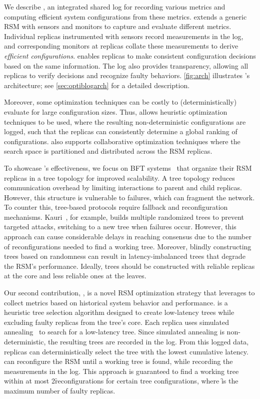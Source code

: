 We describe \sysname, an integrated shared log for recording various metrics and computing efficient system configurations from these metrics.
\sysname extends a generic \ac{RSM} with sensors and monitors to capture and evaluate different metrics.
Individual replicas instrumented with sensors record measurements in the log, and corresponding monitors at replicas collate these measurements to derive \textit{efficient configurations}.
\sysname enables replicas to make consistent configuration decisions based on the same information.
The log also provides transparency, allowing all replicas to verify decisions and recognize faulty behaviors.
\cref{fig:arch} illustrates \sysname's architecture; see \cref{sec:optiblogarch} for a detailed description.

Moreover, some optimization techniques can be costly to (deterministically) evaluate for large configuration sizes.
Thus, \sysname allows heuristic optimization techniques to be used, where the resulting non-deterministic configurations are logged, such that the replicas can consistently determine a global ranking of configurations.
\sysname also supports collaborative optimization techniques where the search space is partitioned and distributed across the \ac{RSM} replicas.

To showcase \sysname's effectiveness, we focus on BFT systems~\cite{kauri, omniledger, byzcoin} that organize their RSM replicas in a tree topology for improved scalability.
A tree topology reduces communication overhead by limiting interactions to parent and child replicas.
However, this structure is vulnerable to failures, which can fragment the network.
To counter this, tree-based protocols require fallback and reconfiguration mechanisms.
Kauri~\cite{kauri}, for example, builds multiple randomized trees to prevent targeted attacks, switching to a new tree when failures occur.
However, this approach can cause considerable delays in reaching consensus due to the number of reconfigurations needed to find a working tree.
Moreover, blindly constructing trees based on randomness can result in latency-imbalanced trees that degrade the RSM's performance.
Ideally, trees should be constructed with reliable replicas at the core and less reliable ones at the leaves.

Our second contribution, \optitree, is a novel RSM optimization strategy that leverages \sysname to collect metrics based on historical system behavior and performance.
\optitree is a heuristic tree selection algorithm designed to create low-latency trees while excluding faulty replicas from the tree's core.
Each replica uses simulated annealing~\cite{simulatedannealing} to search for a low-latency tree.
Since simulated annealing is non-deterministic, the resulting trees are recorded in the log.
From this logged data, replicas can deterministically select the tree with the lowest cumulative latency.
\optitree can reconfigure the RSM until a working tree is found, while recording the measurements in the log.
This approach is guaranteed to find a working tree within at most 2\f reconfigurations for certain tree configurations, where \f is the maximum number of faulty replicas.

